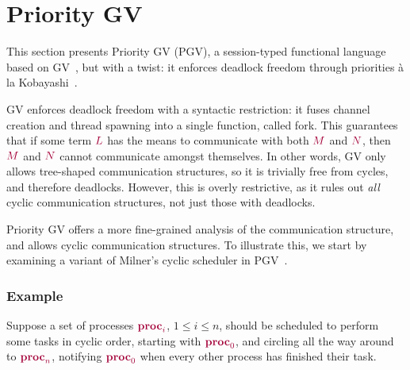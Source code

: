 \documentclass[main.tex]{subfiles}
\begin{document}
\section{Priority GV}\label{sec:pgv}

This section presents Priority GV (PGV), a session-typed functional language based on GV~\cite{wadler15,lindleymorris15}, but with a twist: it enforces deadlock freedom through priorities \`{a} la Kobayashi~\cite{kobayashi06,padovaninovara15}.

GV enforces deadlock freedom with a syntactic restriction: it fuses channel creation and thread spawning into a single function, called fork. This guarantees that if some term $\tm{L}$ has the means to communicate with both $\tm{M}$ and $\tm{N}$, then $\tm{M}$ and $\tm{N}$ cannot communicate amongst themselves. In other words, GV only allows tree-shaped communication structures, so it is trivially free from cycles, and therefore deadlocks. However, this is overly restrictive, as it rules out \emph{all} cyclic communication structures, not just those with deadlocks.

Priority GV offers a more fine-grained analysis of the communication structure, and allows cyclic communication structures. To illustrate this, we start by examining a variant of Milner's cyclic scheduler in PGV~\cite{milner89}.

\subsubsection*{Example}\label{sec:pgv-example}
Suppose a set of processes $\tm{\proc{i}}$, $1\leq{i}\leq{n}$, should be scheduled to perform some tasks in cyclic order, starting with $\tm{\proc0}$, and circling all the way around to $\tm{\proc{n}}$, notifying $\tm{\proc0}$ when every other process has finished their task.
\end{document}
